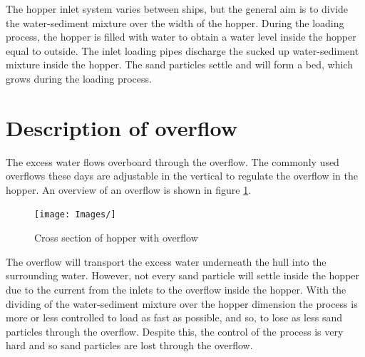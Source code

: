 \noindent
The hopper inlet system varies between ships, but the general aim is to divide the water-sediment mixture over the width of the hopper. During the loading process, the hopper is filled with water to obtain a water level inside the hopper equal to outside. The inlet loading pipes discharge the sucked up water-sediment mixture inside the hopper. The sand particles settle and will form a bed, which grows during the loading process. 






\section{Description of overflow}


The excess water flows overboard through the overflow. The commonly used overflows these days are adjustable in the vertical to regulate the overflow in the hopper. An overview of an overflow is shown in figure \ref{fig:Overflow}. 

\begin{figure}[ht!]
    \centering
    \texttt{[image: Images/]}
    \caption{Cross section of hopper with overflow}
    \label{fig:Overflow}
\end{figure}

\noindent
The overflow will transport the excess water underneath the hull into the surrounding water. However, not every sand particle will settle inside the hopper due to the current from the inlets to the overflow inside the hopper. With the dividing of the water-sediment mixture over the hopper dimension the process is more or less controlled to load as fast as possible, and so, to lose as less sand particles through the overflow. Despite this, the control of the process is very hard and so sand particles are lost through the overflow.\newline







